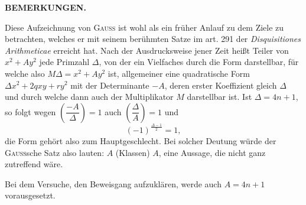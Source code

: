 \par\bigskip\begin{center}\textbf{BEMERKUNGEN.}\end{center}
\begingroup\small
\makeatletter\tagsleft@true\let\veqno\@@leqno\makeatother
\par\indent Diese Aufzeichnung von \textsc{Gauss} ist wohl als ein früher Anlauf zu dem Ziele zu betrachten, welches
er mit seinem berühmten Satze im art. 291 der \textit{Disquisitiones Arithmeticae} erreicht hat. Nach der Ausdrucksweise jener Zeit heißt Teiler von $x^2+Ay^2$ jede Primzahl $\Delta$, von der ein Vielfaches durch die Form
darstellbar, für welche also $M\Delta=x^2+Ay^2$ ist, allgemeiner eine quadratische Form $\Delta x^2+2qxy+ry^2$
mit der Determinante $-A$, deren erster Koeffizient gleich $\Delta$ und durch welche dann auch der Multiplikator $M$ darstellbar ist. Ist $\Delta=4n+1$, so folgt wegen $\left(\dfrac{-A}{\Delta}\right)=1$ auch $\left(\dfrac\Delta A\right)=1$ und
\[
(-1)^{\frac{\Delta-1}{2}}=1,
\]
\noindent die Form gehört also zum Hauptgeschlecht. Bei solcher Deutung würde der \textsc{Gauss}sche Satz also lauten:
$A$ (Klassen) $A$, eine Aussage, die nicht ganz zutreffend wäre.

Bei dem Versuche, den Beweisgang aufzuklären, werde auch $A=4n+1$ vorausgesetzt.

